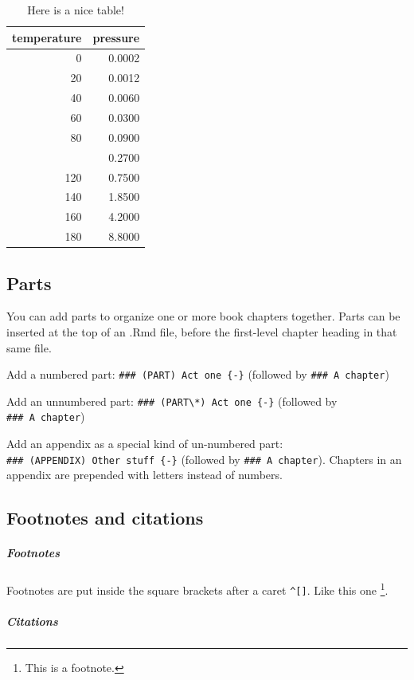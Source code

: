 \documentclass[
]{book}
\begin{document}
{{{\begin{table}
\caption{\label{tab:nice-tab}Here is a nice table!}
\centering
\begin{tabular}[t]{rr}
\toprule
temperature & pressure\\
\midrule
0 & 0.0002\\
20 & 0.0012\\
40 & 0.0060\\
60 & 0.0300\\
80 & 0.0900\\
\addlinespace
100 & 0.2700\\
120 & 0.7500\\
140 & 1.8500\\
160 & 4.2000\\
180 & 8.8000\\
\bottomrule
\end{tabular}
\end{table}

\hypertarget{parts}{%
\subsection{Parts}\label{parts}}

You can add parts to organize one or more book chapters together. Parts can be inserted at the top of an .Rmd file, before the first-level chapter heading in that same file.

Add a numbered part: \texttt{\#\#\#\ (PART)\ Act\ one\ \{-\}} (followed by \texttt{\#\#\#\ A\ chapter})

Add an unnumbered part: \texttt{\#\#\#\ (PART\textbackslash{}*)\ Act\ one\ \{-\}} (followed by \texttt{\#\#\#\ A\ chapter})

Add an appendix as a special kind of un-numbered part: \texttt{\#\#\#\ (APPENDIX)\ Other\ stuff\ \{-\}} (followed by \texttt{\#\#\#\ A\ chapter}). Chapters in an appendix are prepended with letters instead of numbers.

\hypertarget{footnotes-and-citations}{%
\subsection{Footnotes and citations}\label{footnotes-and-citations}}

\hypertarget{footnotes}{%
\subparagraph{Footnotes}\label{footnotes}}

Footnotes are put inside the square brackets after a caret \texttt{\^{}{[}{]}}. Like this one \footnote{This is a footnote.}.

\hypertarget{citations}{%
\subparagraph{Citations}\label{citations}}

}}}
\end{document}
